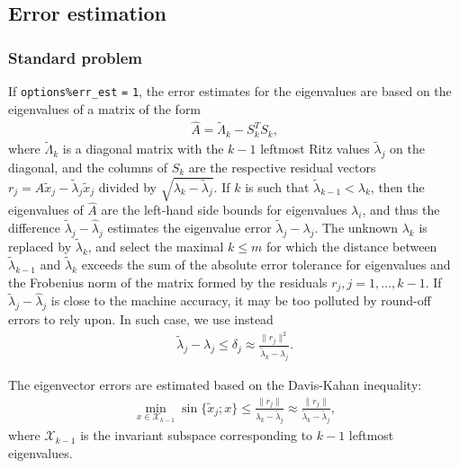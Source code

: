 \subsection{Error estimation}

\label{ssmfe_expert:errors:est}

\subsubsection{Standard problem}

If {\tt options\%err\_est} {\tt =} {\tt 1}, 
the error estimates for the eigenvalues are based on 
the eigenvalues of a matrix of the form
%
\begin{eqnarray}
\label{L.mx}
\hat A = %
\tilde\Lambda_k - S_k^T S_k,
\end{eqnarray}
%
where $\tilde\Lambda_k$ is a diagonal matrix with
the $k-1$ leftmost Ritz values $\tilde\lambda_j$
on the diagonal,
and the columns of $S_k$ are the respective
residual vectors $r_j = A \tilde x_j - \tilde\lambda_j \tilde x_j$
divided by $\sqrt{\lambda_k - \tilde\lambda_j}$.
If $k$ is such that
$\tilde\lambda_{k-1} < \lambda_k$,
then the eigenvalues of $\hat A$ are
the left-hand side bounds for
eigenvalues $\lambda_i$,
and thus
the difference $\tilde\lambda_j - \hat\lambda_j$ estimates
the eigenvalue error $\tilde\lambda_j - \lambda_j$.
The unknown  $\lambda_k$ is replaced by $\tilde\lambda_k$,
and select the maximal $k \le m$ for which
the distance between $\tilde\lambda_{k-1}$ and $\tilde\lambda_k$
exceeds the sum of the absolute error tolerance for eigenvalues
and the Frobenius norm of the matrix formed by the residuals
$r_j, j = 1, \ldots, k-1$.
If  $\tilde\lambda_j - \hat\lambda_j$
is close to the machine accuracy, it may be too polluted
by round-off errors to rely upon.
In such case, we use instead
%
\begin{eqnarray}
\tilde\lambda_j - \lambda_j \le \delta_j \approx
\frac{\|r_j\|^2}{\tilde\lambda_k - \lambda_j}.
\end{eqnarray}

The eigenvector errors are estimated based on 
the Davis-Kahan inequality:
%
\begin{eqnarray}
\min_{x \in \mathcal{X}_{k-1}}
\sin\{\tilde x_j; x\} \le
\frac{\|r_j\|}{\lambda_k - \tilde\lambda_j} \approx
\frac{\|r_j\|}{\tilde\lambda_k - \tilde\lambda_j},
\end{eqnarray}
%
where $\mathcal{X}_{k-1}$ is the invariant subspace 
corresponding to $k-1$ leftmost eigenvalues.

